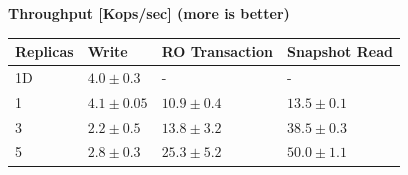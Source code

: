 \documentclass{beamer}
\begin{document}
\begin{frame}
{    %
    \textbf{Throughput [Kops/sec] (more is better)}
    \begin{center}
      {\footnotesize
      \begin{tabular}{|l||l|l|l|}
        \hline
        Replicas & Write & RO Transaction & Snapshot Read \tabularnewline
        \hline\hline
        1D & $4.0\pm0.3$ & - & - \tabularnewline
        \hline
        1 & $4.1\pm0.05$ & $10.9\pm0.4$ & $13.5\pm0.1$ \tabularnewline
        \hline
        3 & $2.2\pm0.5$ & $13.8\pm3.2$ & $38.5\pm0.3$ \tabularnewline
        \hline
        5 & $2.8\pm0.3$ & $25.3\pm5.2$ & $50.0\pm1.1$ \tabularnewline
        \hline
      \end{tabular}
      }
    \end{center}
  }
\end{frame}

\end{document}
